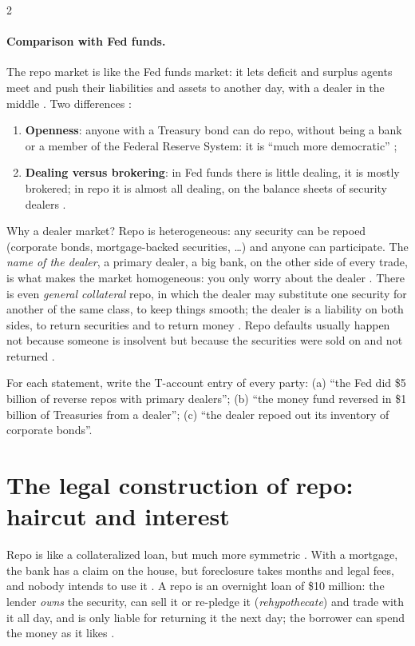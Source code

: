 \begin{paracol}{2}
\paragraph{Comparison with Fed funds.} The repo market is like the Fed funds market: it lets deficit and surplus agents meet and push their liabilities and
assets to another day, with a dealer in the middle . Two differences :
\begin{enumerate}
  \item \textbf{Openness}: anyone with a Treasury bond can do repo, without being a bank or a member of the Federal Reserve System: it is ``much more
        democratic'' ;
  \item \textbf{Dealing versus brokering}: in Fed funds there is little dealing, it is mostly brokered; in repo it is almost all dealing, on the balance
        sheets of security dealers .
\end{enumerate}
Why a dealer market? Repo is heterogeneous: any security can be repoed (corporate bonds, mortgage-backed securities, \dots) and anyone can participate.
The \emph{name of the dealer}, a primary dealer, a big bank, on the other side of every trade, is what makes the market homogeneous: you only worry about
the dealer . There is even \emph{general collateral} repo, in which the dealer may substitute one
security for another of the same class, to keep things smooth; the dealer is a liability on both sides, to return securities and to return money
. Repo defaults usually happen not because someone is insolvent but because the securities were sold on and not returned
.

\begin{exercise}
For each statement, write the T-account entry of every party: (a) ``the Fed did \$5 billion of reverse repos with primary dealers''; (b) ``the money fund reversed in
\$1 billion of Treasuries from a dealer''; (c) ``the dealer repoed out its inventory of corporate bonds''.
\end{exercise}

\section{The legal construction of repo: haircut and interest}\label{sec:rp-legal}

Repo is like a collateralized loan, but much more symmetric . With a mortgage, the bank has a claim on the house, but foreclosure takes months
and legal fees, and nobody intends to use it . A repo is an overnight loan of \$10 million: the lender \emph{owns} the security, can sell it or
re-pledge it (\emph{rehypothecate}) and trade with it all day, and is only liable for returning it the next day; the borrower can spend the money as it likes
.


\end{paracol}
